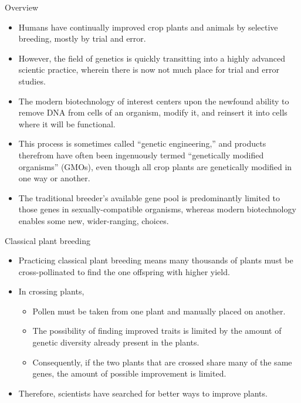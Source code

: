 \documentclass[ignorenonframetext,aspectratio=169]{beamer}
\providecommand{\tightlist}{%
  \setlength{\itemsep}{0pt}\setlength{\parskip}{0pt}}
\begin{document}
\begin{frame}{Overview}
\protect\hypertarget{overview-1}{}

\begin{itemize}
\tightlist
\item
  Humans have continually improved crop plants and animals by selective
  breeding, mostly by trial and error.
\item
  However, the field of genetics is quickly transitting into a highly
  advanced scientic practice, wherein there is now not much place for
  trial and error studies.
\item
  The modern biotechnology of interest centers upon the newfound ability
  to remove DNA from cells of an organism, modify it, and reinsert it
  into cells where it will be functional.
\item
  This process is sometimes called ``genetic engineering,'' and products
  therefrom have often been ingenuously termed ``genetically modified
  organisms'' (GMOs), even though all crop plants are genetically
  modified in one way or another.
\item
  The traditional breeder's available gene pool is predominantly limited
  to those genes in sexually-compatible organisms, whereas modern
  biotechnology enables some new, wider-ranging, choices.
\end{itemize}

\end{frame}

\begin{frame}{Classical plant breeding}
\protect\hypertarget{classical-plant-breeding}{}

\begin{itemize}
\tightlist
\item
  Practicing classical plant breeding means many thousands of plants
  must be cross-pollinated to find the one offspring with higher yield.
\item
  In crossing plants,

  \begin{itemize}
  \tightlist
  \item
    Pollen must be taken from one plant and manually placed on another.
  \item
    The possibility of finding improved traits is limited by the amount
    of genetic diversity already present in the plants.
  \item
    Consequently, if the two plants that are crossed share many of the
    same genes, the amount of possible improvement is limited.
  \end{itemize}
\item
  Therefore, scientists have searched for better ways to improve plants.
\end{itemize}

\end{frame}
\end{document}
